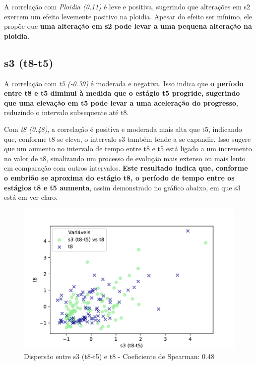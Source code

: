 A correlação com \textit{Ploidia (0.11)} é leve e positiva, sugerindo que alterações em s2 exercem um efeito levemente positivo na ploidia. Apesar do efeito ser mínimo, ele propõe que \textbf{uma alteração em s2 pode levar a uma pequena alteração na ploidia}.

\subsection*{s3 (t8-t5)}
A correlação com \textit{t5 (-0.39)} é moderada e negativa. Isso indica que \textbf{o período entre t8 e t5 diminui à medida que o estágio t5 progride, sugerindo que uma elevação em t5 pode levar a uma aceleração do progresso}, reduzindo o intervalo subsequente até t8. 

Com \textit{t8 (0.48)}, a correlação é positiva e moderada mais alta que t5, indicando que, conforme t8 se eleva, o intervalo s3 também tende a se expandir. Isso sugere que um aumento no intervalo de tempo entre t8 e t5 está ligado a um incremento no valor de t8, sinalizando um processo de evolução mais extenso ou mais lento em comparação com outros intervalos. \textbf{Este resultado indica que, conforme o embrião se aproxima do estágio t8, o período de tempo entre os estágios t8 e t5 aumenta}, assim demonstrado no gráfico abaixo, em que s3 está em ver claro. 

\begin{figure}[h]
    \captionsetup{font=footnotesize, justification=centering, labelsep=period, position=above}
    \caption{Dispersão entre s3 (t8-t5) e t8 - Coeficiente de Spearman: 0.48}
    \label{fig:s3-t8}
    \centering
    \includegraphics[scale=0.4]{figuras/Spearman/s3-t8.pdf}
    \vspace{0.3cm} 
    \begin{minipage}{\linewidth}
        \centering
    \end{minipage}
\end{figure}
\FloatBarrier

